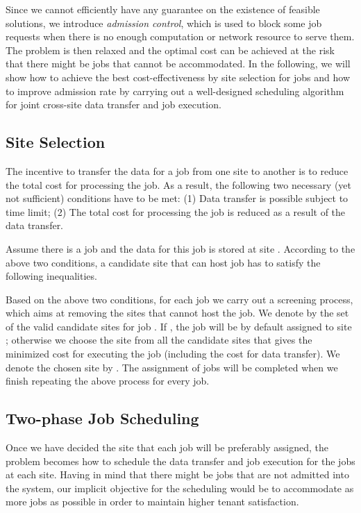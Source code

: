 \documentclass{article}
\begin{document}
Since we cannot efficiently have any guarantee on the existence of feasible solutions, we introduce \textit{admission control}, which is used to block some job requests when there is no enough computation or network resource to serve them. The problem is then relaxed and the optimal cost can be achieved at the risk that there might be jobs that cannot be accommodated. In the following, we will show how to achieve the best cost-effectiveness by site selection for jobs and how to improve admission rate by carrying out a well-designed scheduling algorithm for joint cross-site data transfer and job execution.

\subsection{Site Selection}

The incentive to transfer the data for a job from one site to another is to reduce the total cost for processing the job. As a result, the following two necessary (yet not sufficient) conditions have to be met: (1) Data transfer is possible subject to time limit; (2) The total cost for processing the job is reduced as a result of the data transfer.

Assume there is a job  and the data for this job is stored at site . According to the above two conditions, a candidate site  that can host job  has to satisfy the following inequalities.

Based on the above two conditions, for each job  we carry out a screening process, which aims at removing the sites that cannot host the job. We denote by  the set of the valid candidate sites for job . If , the job will be by default assigned to site ; otherwise we choose the site from all the candidate sites  that gives the minimized cost for executing the job (including the cost for data transfer). We denote the chosen site by . The assignment of jobs will be completed when we finish repeating the above process for every job.







\subsection{Two-phase Job Scheduling}

Once we have decided the site that each job will be preferably assigned, the problem becomes how to schedule the data transfer and job execution for the jobs at each site. Having in mind that there might be jobs that are not admitted into the system, our implicit objective for the scheduling would be to accommodate as more jobs as possible in order to maintain higher tenant satisfaction.
\end{document}
